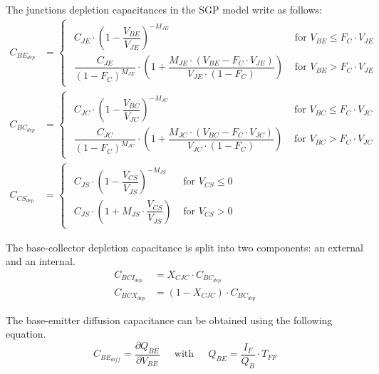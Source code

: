 The junctions depletion capacitances in the SGP model write as
follows:
\begin{align}
C_{BE_{dep}} &= 
\begin{cases}
\begin{array}{ll}
C_{JE}\cdot \left(1 - \dfrac{V_{BE}}{V_{JE}}\right)^{-M_{JE}} & \textrm{ for } V_{BE} \le F_{C}\cdot V_{JE}\\
\dfrac{C_{JE}}{\left(1 - F_{C}\right)^{M_{JE}}}\cdot \left(1 + \dfrac{M_{JE}\cdot \left(V_{BE} - F_{C}\cdot V_{JE}\right)}{V_{JE}\cdot \left(1 - F_{C}\right)}\right) & \textrm{ for } V_{BE} > F_{C}\cdot V_{JE}
\end{array}
\end{cases}\\
C_{BC_{dep}} &= 
\begin{cases}
\begin{array}{ll}
C_{JC}\cdot \left(1 - \dfrac{V_{BC}}{V_{JC}}\right)^{-M_{JC}} & \textrm{ for } V_{BC} \le F_{C}\cdot V_{JC}\\
\dfrac{C_{JC}}{\left(1 - F_{C}\right)^{M_{JC}}}\cdot \left(1 + \dfrac{M_{JC}\cdot \left(V_{BC} - F_{C}\cdot V_{JC}\right)}{V_{JC}\cdot \left(1 - F_{C}\right)}\right) & \textrm{ for } V_{BC} > F_{C}\cdot V_{JC}
\end{array}
\end{cases}\\
C_{CS_{dep}} &= 
\begin{cases}
\begin{array}{ll}
C_{JS}\cdot \left(1 - \dfrac{V_{CS}}{V_{JS}}\right)^{-M_{JS}} & \textrm{ for } V_{CS} \le 0\\
C_{JS}\cdot \left(1 + M_{JS}\cdot \dfrac{V_{CS}}{V_{JS}}\right) & \textrm{ for } V_{CS} > 0
\end{array}
\end{cases}
\end{align}

The base-collector depletion capacitance is split into two components:
an external and an internal.
\begin{align}
C_{BCI_{dep}} &= X_{CJC}\cdot C_{BC_{dep}}\\
C_{BCX_{dep}} &= \left(1 - X_{CJC}\right)\cdot C_{BC_{dep}}
\end{align}

The base-emitter diffusion capacitance can be obtained using the
following equation.
\begin{equation}
C_{BE_{diff}} = \dfrac{\partial Q_{BE}}{\partial V_{BE}}
\;\;\;\; \text{ with } \;\;\;\;
\label{eq:Qbe}
Q_{BE} = \dfrac{I_F}{Q_B}\cdot T_{FF}
\end{equation}

